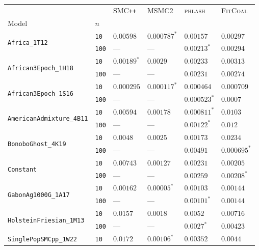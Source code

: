 \begin{footnotesize}
\begin{tabular}{llllll}
\toprule
 &  & \textsc{SMC}\texttt{{++}} & \textsc{MSMC2} & \textsc{phlash} & \textsc{FitCoal} \\
Model & $n$ &  &  &  &  \\
\midrule
\multirow[c]{2}{*}{\texttt{Africa\_1T12}} & \texttt{10} & $0.00598$ & $\mathbf{0.000787}^*$ & $0.00157$ & $0.00297$ \\
 & \texttt{100} & --- & --- & $\mathbf{0.00213}^*$ & $0.00294$ \\
\cline{1-6}
\multirow[c]{2}{*}{\texttt{African3Epoch\_1H18}} & \texttt{10} & $\mathbf{0.00189}^*$ & $0.0029$ & $0.00233$ & $0.00313$ \\
 & \texttt{100} & --- & --- & $\mathbf{0.00231}$ & $0.00274$ \\
\cline{1-6}
\multirow[c]{2}{*}{\texttt{African3Epoch\_1S16}} & \texttt{10} & $0.000295$ & $\mathbf{0.000117}^*$ & $0.000464$ & $0.000709$ \\
 & \texttt{100} & --- & --- & $\mathbf{0.000523}^*$ & $0.0007$ \\
\cline{1-6}
\multirow[c]{2}{*}{\texttt{AmericanAdmixture\_4B11}} & \texttt{10} & $0.00594$ & $0.00178$ & $\mathbf{0.000811}^*$ & $0.0103$ \\
 & \texttt{100} & --- & --- & $\mathbf{0.00122}^*$ & $0.012$ \\
\cline{1-6}
\multirow[c]{2}{*}{\texttt{BonoboGhost\_4K19}} & \texttt{10} & $0.0048$ & $0.0025$ & $\mathbf{0.00173}$ & $0.0234$ \\
 & \texttt{100} & --- & --- & $0.00491$ & $\mathbf{0.000695}^*$ \\
\cline{1-6}
\multirow[c]{2}{*}{\texttt{Constant}} & \texttt{10} & $0.00743$ & $\mathbf{0.00127}$ & $0.00231$ & $0.00205$ \\
 & \texttt{100} & --- & --- & $0.00259$ & $\mathbf{0.00208}^*$ \\
\cline{1-6}
\multirow[c]{2}{*}{\texttt{GabonAg1000G\_1A17}} & \texttt{10} & $0.00162$ & $\mathbf{0.00005}^*$ & $0.00103$ & $0.00144$ \\
 & \texttt{100} & --- & --- & $\mathbf{0.00101}^*$ & $0.00144$ \\
\cline{1-6}
\multirow[c]{2}{*}{\texttt{HolsteinFriesian\_1M13}} & \texttt{10} & $0.0157$ & $\mathbf{0.0018}$ & $0.0052$ & $0.00716$ \\
 & \texttt{100} & --- & --- & $\mathbf{0.0027}^*$ & $0.00423$ \\
\cline{1-6}
\multirow[c]{2}{*}{\texttt{SinglePopSMCpp\_1W22}} & \texttt{10} & $0.0172$ & $\mathbf{0.00106}^*$ & $0.00352$ & $0.0044$ \\

\end{tabular}
\end{footnotesize}
